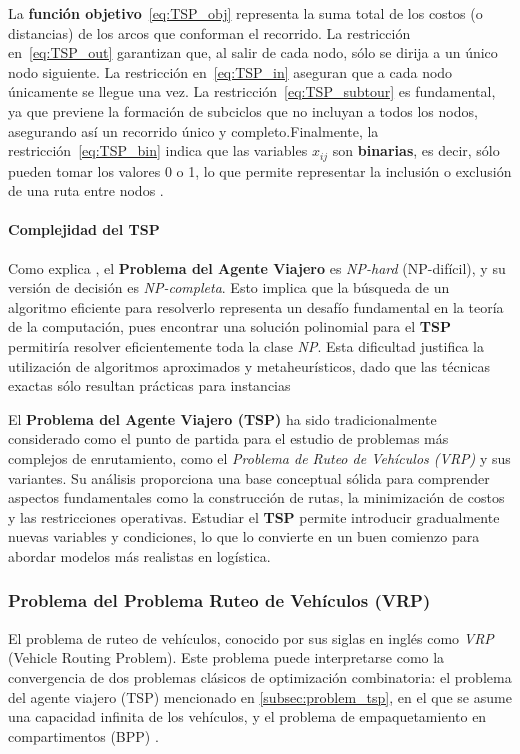 \documentclass[12pt,titlepage,twoside,openright]{book}
\begin{document}
La \textbf{función objetivo}~\eqref{eq:TSP_obj} representa la suma total de los costos (o distancias) de los arcos que conforman el recorrido. La restricción en~\eqref{eq:TSP_out} garantizan que, al salir de cada nodo, sólo se dirija a un único nodo siguiente. La restricción en~\eqref{eq:TSP_in} aseguran que a cada nodo únicamente se llegue una vez. La restricción~\eqref{eq:TSP_subtour} es fundamental, ya que previene la formación de subciclos que no incluyan a todos los nodos, asegurando así un recorrido único y completo.Finalmente, la restricción~\eqref{eq:TSP_bin} indica que las variables \(x_{ij}\) son \textbf{binarias}, es decir, sólo pueden tomar los valores 0 o 1, lo que permite representar la inclusión o exclusión de una ruta entre nodos \citep{torres2018}.

\paragraph{Complejidad del TSP}

Como explica \cite{papadimitriou1998}, el \textbf{Problema del Agente Viajero} es \textit{NP-hard} (NP-difícil), y su versión de decisión es \textit{NP-completa}. Esto implica que la búsqueda de un algoritmo eficiente para resolverlo representa un desafío fundamental en la teoría de la computación, pues encontrar una solución polinomial para el \textbf{TSP} permitiría resolver eficientemente toda la clase \textit{NP}. Esta dificultad justifica la utilización de algoritmos aproximados y metaheurísticos, dado que las técnicas exactas sólo resultan prácticas para instancias

El \textbf{Problema del Agente Viajero (TSP)} ha sido tradicionalmente considerado como el punto de partida para el estudio de problemas más complejos de enrutamiento, como el \textit{Problema de Ruteo de Vehículos (VRP)} y sus variantes. Su análisis proporciona una base conceptual sólida para comprender aspectos fundamentales como la construcción de rutas, la minimización de costos y las restricciones operativas. Estudiar el \textbf{TSP} permite introducir gradualmente nuevas variables y condiciones, lo que lo convierte en un buen comienzo para abordar modelos más realistas en logística.

\subsubsection{Problema del Problema Ruteo de Vehículos (VRP)}
\label{subsec:problem_vrp}
El problema de ruteo de vehículos, conocido por sus siglas en inglés como \textit{VRP} (Vehicle Routing Problem). Este problema puede interpretarse como la convergencia de dos problemas clásicos de optimización combinatoria: el problema del agente viajero (TSP) mencionado en \autoref{subsec:problem_tsp}, en el que se asume una capacidad infinita de los vehículos, y el problema de empaquetamiento en compartimentos (BPP) \cite{daza2009}.
\end{document}
